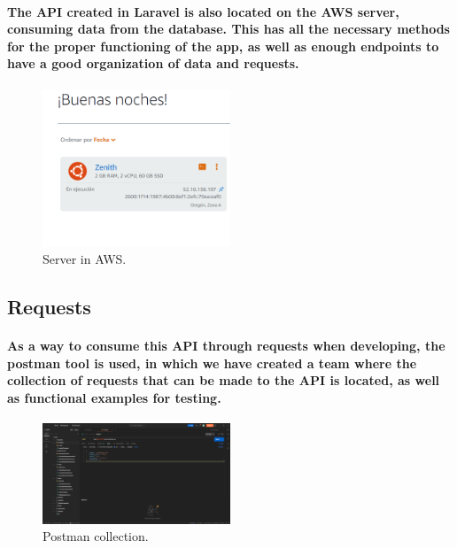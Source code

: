 \documentclass[12pt,a4paper]{article}
\begin{document}
    \paragraph{The API created in Laravel is also located on the AWS server, consuming data from the database. This has all the necessary methods for the proper functioning of the app, as well as enough endpoints to have a good organization of data and requests.}

   \begin{figure}[ht]
      \centering
      \includegraphics[width=0.5\textwidth]{server.png}
      \caption{Server in AWS.}
    \end{figure}

    \subsection{Requests}

    \paragraph{As a way to consume this API through requests when developing, the postman tool is used, in which we have created a team where the collection of requests that can be made to the API is located, as well as functional examples for testing.}

    \begin{figure}[ht]
      \centering
      \includegraphics[width=0.5\textwidth]{postman.png}
      \caption{Postman collection.}
    \end{figure}
\end{document}
